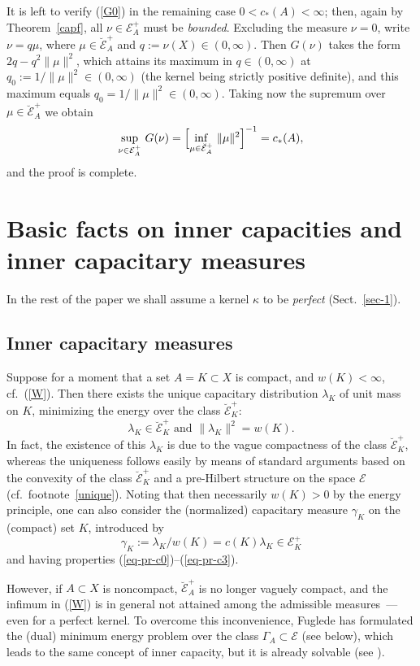 \documentclass[12pt,a4paper,reqno]{amsart} %
\theoremstyle{lause}
\theoremstyle{maaritelma}
\theoremstyle{lause}
\theoremstyle{maaritelma}
\numberwithin{equation}{section}
\begin{document}
It is left to verify (\ref{G0}) in the remaining case $0<c_*(A)<\infty$; then, again by Theorem~\ref{capf}, all $\nu\in\mathcal E^+_A$ must be {\it bounded}. Excluding the measure $\nu=0$, write $\nu=q\mu$, where $\mu\in\breve{\mathcal E}^+_A$ and $q:=\nu(X)\in(0,\infty)$. Then $G(\nu)$ takes the form $2q-q^2\|\mu\|^2$,
which attains its maximum in $q\in(0,\infty)$ at $q_0:=1/\|\mu\|^2\in(0,\infty)$ (the kernel being strictly positive definite), and this maximum equals $q_0=1/\|\mu\|^2\in(0,\infty)$.
Taking now the supremum over $\mu\in\breve{\mathcal E}^+_A$ we obtain
\begin{equation}\label{minsup}\sup_{\nu\in\mathcal E^+_A}\,G(\nu)=\Bigl[\inf_{\mu\in\breve{\mathcal E}^+_A}\,\|\mu\|^2\Bigr]^{-1}=c_*(A),\end{equation}
and the proof is complete.

\section{Basic facts on inner capacities and inner capacitary measures}\label{sec-2}

In the rest of the paper we shall assume a kernel $\kappa$ to be {\it perfect\/} (Sect.~\ref{sec-1}).

\subsection{Inner capacitary measures} Suppose for a moment that a set $A=K\subset X$ is compact, and  $w(K)<\infty$, cf.\ (\ref{W}). Then there exists the unique capacitary distribution $\lambda_K$ of unit mass on $K$, minimizing the energy over the class $\breve{\mathcal E}^+_K$:
\[\lambda_K\in\breve{\mathcal E}^+_K\text{ \ and \ }\|\lambda_K\|^2=w(K).\]
In fact, the existence of this $\lambda_K$ is due to the vague compactness of the class $\breve{\mathcal E}^+_K$, whereas the uniqueness follows easily by means of standard arguments based on the convexity of the class $\breve{\mathcal E}^+_K$ and a pre-Hilbert structure on the space $\mathcal E$ (cf.\ footnote~\ref{unique}).
Noting that then necessarily $w(K)>0$ by the energy principle, one can also consider the (normalized) capacitary measure $\gamma_K$ on the (compact) set $K$, introduced by
\begin{equation}\label{G}\gamma_K:=\lambda_K/w(K)=c(K)\lambda_K\in\mathcal E^+_K\end{equation}
and having properties (\ref{eq-pr-c0})--(\ref{eq-pr-c3}).

However, if $A\subset X$ is noncompact, $\breve{\mathcal E}^+_A$ is no longer vaguely compact, and the infimum in (\ref{W})
is in general not attained among the admissible measures~--- even for a perfect kernel.
To overcome this inconvenience, Fuglede has formulated the (dual) minimum energy problem over the class $\Gamma_A\subset\mathcal E$ (see below), which leads to the same concept of inner capacity, but it is already solvable (see \cite[Theorem~4.1]{F1}).
\end{document}
